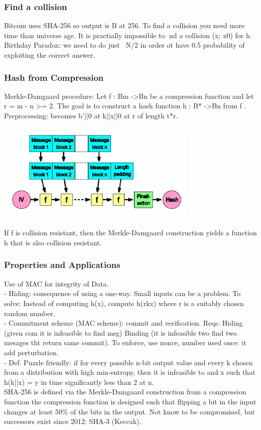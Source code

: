 \documentclass{article}
\begin{document}
\subsubsection{Find a collision}
Bitcoin uses SHA-256 so output is B at 256. To find a collision you need more time than universe age. It is practially impossible to nd a collision (x; x0) for h.\\
Birthday Paradox: we need to do just ~N/2 in order ot have 0.5 probability of exploiting the correct answer.

\subsubsection{Hash from Compression}
Merkle-Damgaard procedure: Let f : Bm -\textgreater Bn be a compression function and let r = m - n \textgreater=  2. The goal is to construct a hash function h : B* -\textgreater Bn from f .\\ Preprocessing: becomes b'||0 at k||x||0 at r of length t*r.\\\\
\includegraphics[scale=0.8]{2.png}\\\\
If f is collision resistant, then the Merkle-Damgaard construction yields a function h that is also collision resistant.\\
\subsubsection{Properties and Applications}
Use of MAC for integrity of Data. \\
- Hiding: consequence of using a one-way. Small inputs can be a problem. To solve: Instead of computing h(x), compute h(rkx) where r is a suitably chosen random number.\\
- Commitment scheme (MAC scheme): commit and verification. Reqs: Hiding (given com it is infeasible to find msg) Binding (it is infeasible two find two mesages tht return same commit). To enforce, use nonce, number used once: it add perturbation.\\
- Def. Puzzle friendly: if for every possible n-bit output value and every k
chosen from a distribution with high min-entropy, then it is infeasible to and x such that h(k||x) = y in time significantly less than 2 at n.\\
SHA-256 is defined via the Merkle-Damgaard construction from a compression function the compression function is designed such that flipping a bit in the input changes at least 50$\%$ of the bits in the output. Not know to be compromised, but successors exist since 2012: SHA-3 (Keccak).
\newpage
\end{document}
